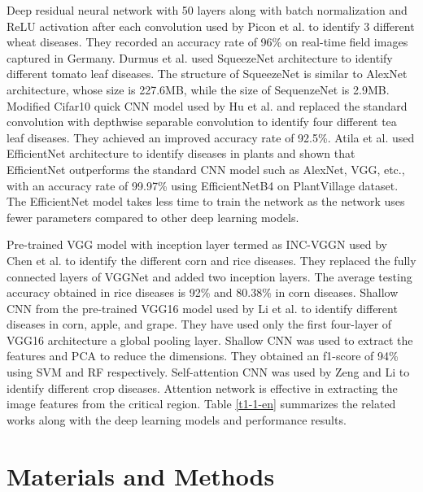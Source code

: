 Deep residual neural network with 50 layers along with batch normalization and ReLU activation after each convolution used by Picon et al.  to identify 3 different wheat diseases. They recorded an accuracy rate of 96\% on real-time field images captured in Germany. Durmus et al.  used SqueezeNet architecture to identify different tomato leaf diseases. The structure of SqueezeNet is similar to AlexNet architecture, whose size is 227.6MB, while the size of SequenzeNet is 2.9MB. Modified Cifar10 quick CNN model used by Hu et al.  and replaced the standard convolution with depthwise separable convolution to identify four different tea leaf diseases. They achieved an improved accuracy rate of 92.5\%. Atila et al.  used EfficientNet architecture to identify diseases in plants and shown that EfficientNet outperforms the standard CNN model such as AlexNet, VGG, etc., with an accuracy rate of 99.97\% using EfficientNetB4 on PlantVillage dataset. The EfficientNet model takes less time to train the network as the network uses fewer parameters compared to other deep learning models.

Pre-trained VGG model with inception layer termed as INC-VGGN used by Chen et al.  to identify the different corn and rice diseases. They replaced the fully connected layers of VGGNet and added two inception layers. The average testing accuracy obtained in rice diseases is 92\% and 80.38\% in corn diseases. Shallow CNN from the pre-trained VGG16 model used by Li et al.  to identify different diseases in corn, apple, and grape. They have used only the first four-layer of VGG16 architecture a global pooling layer. Shallow CNN was used to extract the features and PCA to reduce the dimensions. They obtained an f1-score of 94\% using SVM and RF respectively. Self-attention CNN was used by Zeng and Li  to identify different crop diseases. Attention network is effective in extracting the image features from the critical region. Table \ref{t1-1-en} summarizes the related works along with the deep learning models and performance results.


\section{Materials and Methods} \label{s3-en}

